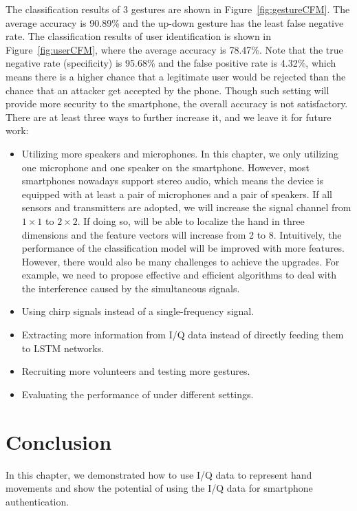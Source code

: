 The classification results of 3 gestures are shown in Figure~\ref{fig:gestureCFM}. The average accuracy is 90.89\% and the up-down gesture has the least false negative rate. The classification results of user identification is shown in Figure~\ref{fig:userCFM}, where the average accuracy is 78.47\%.  Note that the true negative rate (specificity) is 95.68\% and the false positive rate is 4.32\%, which means there is a higher chance that a legitimate user would be rejected than the chance that an attacker get accepted by the phone. Though such setting will provide more security to the smartphone, the overall accuracy is not satisfactory. There are at least three ways to further increase it, and we leave it for future work:
\begin{itemize}
	\item Utilizing more speakers and microphones. In this chapter, we only utilizing one microphone and one speaker on the smartphone. However, most smartphones nowadays support stereo audio, which means the device is equipped with at least a pair of microphones and a pair of speakers. If all sensors and transmitters are adopted, we will increase the signal channel from $1\times1$ to $2 \times2$. If doing so, {\uu} will be able to localize the hand in three dimensions and the feature vectors will increase from 2 to 8. Intuitively, the performance of the classification model will be improved with more features. However, there would also be many challenges to achieve the upgrades. For example, we need to propose effective and efficient algorithms to deal with the interference caused by the simultaneous signals.
	\item Using chirp signals instead of a single-frequency signal.
	\item Extracting more information from I/Q data instead of directly feeding them to LSTM networks.
	\item Recruiting more volunteers and testing more gestures.
	\item Evaluating the performance of {\uu} under different settings. 
\end{itemize}







\section{Conclusion}
In this chapter, we demonstrated how to use I/Q data to represent hand movements and show the potential of using the I/Q data for smartphone authentication. 